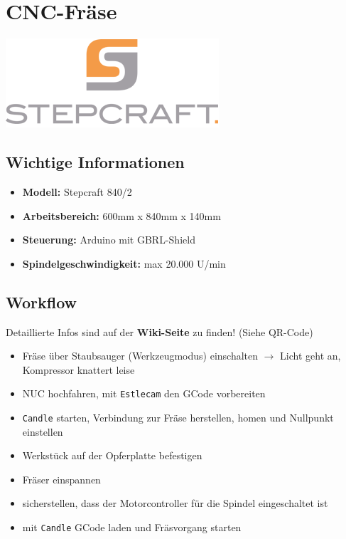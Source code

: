 \documentclass{article}
\begin{document}
	
	\noindent
	\begin{minipage}{0.25\textwidth}
		\section*{CNC-Fräse}
	\end{minipage}
	\hfill
	\begin{minipage}{0.2\textwidth}
		\includegraphics[width=\textwidth]{sc-logo.png}
	\end{minipage}
	\hspace{2em}	
	\begin{minipage}{0.1\textwidth}
				
	\end{minipage}%
	
	\subsection*{Wichtige Informationen}
	\begin{itemize}
		\item \textbf{Modell:} Stepcraft 840/2
		\item \textbf{Arbeitsbereich:} 600mm x 840mm x 140mm
		\item \textbf{Steuerung:} Arduino mit GBRL-Shield
		\item \textbf{Spindelgeschwindigkeit:} max 20.000 U/min
	\end{itemize}
	
	\noindent\dotfill
	\subsection*{Workflow}
	Detaillierte Infos sind auf der\textbf{ Wiki-Seite} zu finden! (Siehe QR-Code)
	\begin{itemize}
		\item Fräse über Staubsauger (Werkzeugmodus) einschalten $\rightarrow$ Licht geht an, Kompressor knattert leise
		\item NUC hochfahren, mit \texttt{Estlecam} den GCode vorbereiten
		\item \texttt{Candle} starten, Verbindung zur Fräse herstellen, homen und Nullpunkt einstellen
		\item Werkstück auf der Opferplatte befestigen
		\item Fräser einspannen
		\item sicherstellen, dass der Motorcontroller für die Spindel eingeschaltet ist
		\item mit \texttt{Candle} GCode laden und Fräsvorgang starten
	\end{itemize}
	
\end{document}
